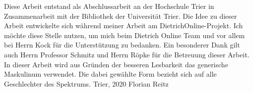 \preface

Diese Arbeit entstand als Abschlussarbeit an der Hochschule Trier in Zusammenarbeit mit der Bibliothek der Universität Trier. 
\newline
\newline
Die Idee zu dieser Arbeit entwickelte sich während meiner Arbeit am DietrichOnline-Projekt. Ich möchte diese Stelle nutzen, um mich beim Dietrich Online Team und vor allem bei Herrn Kock für die Unterstützung zu bedanken.
\newline
\newline
Ein besonderer Dank gilt auch Herrn Professor Schmitz und Herrn Röpke für die Betreuung dieser Arbeit.
\newline
\newline
In dieser Arbeit wird aus Gründen der besseren Lesbarkeit das generische Maskulinum verwendet. Die dabei gewählte Form bezieht sich auf alle Geschlechter des Spektrums.
\newline
\newline
Trier, 2020
\newline
\noindent Florian Reitz